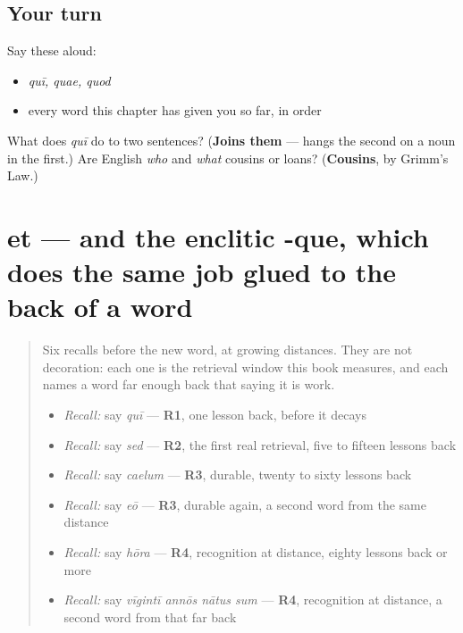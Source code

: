 \subsection*{Your turn}
Say these aloud:

\begin{itemize}
\raggedright
  \item \emph{quī, quae, quod}
  \item every word this chapter has given you so far, in order
\end{itemize}

\begin{tcolorbox}[breakable,colback=teal!4,colframe=teal!35!black,title={Before you move on}]
What does \emph{quī} do to two sentences? (\textbf{Joins them} — hangs the second on a noun in the first.) Are English \emph{who} and \emph{what} cousins or loans? (\textbf{Cousins}, by Grimm's Law.)
\end{tcolorbox}
\section[et]{et — and the enclitic -que, which does the same job glued to the back of a word}

\label{lesson:LA-C49-et}



\begin{quote}
Six recalls before the new word, at growing distances. They are not decoration: each one is the retrieval window this book measures, and each names a word far enough back that saying it is work.

\begin{itemize}
\raggedright
  \item \emph{Recall:} say \emph{quī} — \textbf{R1}, one lesson back, before it decays
  \item \emph{Recall:} say \emph{sed} — \textbf{R2}, the first real retrieval, five to fifteen lessons back
  \item \emph{Recall:} say \emph{caelum} — \textbf{R3}, durable, twenty to sixty lessons back
  \item \emph{Recall:} say \emph{eō} — \textbf{R3}, durable again, a second word from the same distance
  \item \emph{Recall:} say \emph{hōra} — \textbf{R4}, recognition at distance, eighty lessons back or more
  \item \emph{Recall:} say \emph{vīgintī annōs nātus sum} — \textbf{R4}, recognition at distance, a second word from that far back
\end{itemize}
\end{quote}

